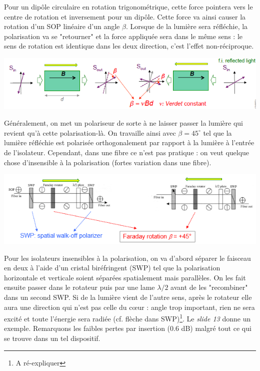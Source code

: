 Pour un dipôle circulaire 
en rotation trigonométrique, cette force pointera vers le centre de rotation et inversement pour
un dipôle. Cette force va ainsi causer la rotation d'un SOP linéaire d'un angle $\beta$. Lorsque
de la lumière sera réfléchie, la polarisation va se "retourner" et la force appliquée sera dans
le même sens : le sens de rotation est identique dans les deux direction, c'est l'effet 
non-réciproque. 
\begin{center}
	\includegraphics[scale=0.76]{ch3/image6}
\end{center}
Généralement, on met un polariseur de sorte à ne laisser passer la lumière qui revient qu'à cette
polarisation-là. On travaille ainsi avec $\beta=45^\circ$ tel que la lumière réfléchie est polarisée 
orthogonalement par rapport à la lumière à l'entrée de l'isolateur. Cependant, dans une fibre ce
n'est pas pratique : on veut quelque chose d'insensible à la polarisation (fortes variation dans une fibre). 

\begin{center}
	\includegraphics[scale=0.76]{ch3/image7}
\end{center}

Pour les isolateurs insensibles à la polarisation, on va d'abord séparer le faisceau en deux à 
l'aide d'un cristal biréfringent (SWP) tel que la polarisation horizontale et verticale soient
séparées spatialement mais parallèles. On les fait ensuite passer dans le rotateur puis par une
lame $\lambda/2$ avant de les "recombiner" dans un second SWP. Si de la lumière vient de l'autre
sens, après le rotateur elle aura une direction qui n'est pas celle du cœur : angle trop important,
rien ne sera excité et toute l'énergie sera radiée (cf. flèche dans SWP)\footnote{A ré-expliquer}. 
Le \textit{slide 13} donne un exemple. Remarquons les faibles pertes par insertion (0.6 dB) malgré 
tout ce qui se trouve dans un tel dispositif. \\

